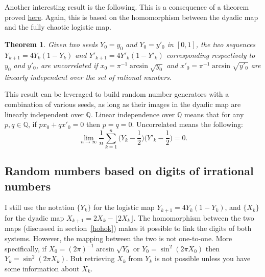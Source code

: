 \documentclass[oneside,10pt]{book}
\newtheorem{theorem}{Theorem}[section]
\begin{document}
Another interesting result is the following. This is a consequence of  a theorem proved
\href{https://stats.stackexchange.com/questions/422354/correlations-between-two-sequences-of-irrational-numbers}{here}. Again, this is based on the homomorphism between the dyadic map and the fully chaotic logistic map.
\begin{theorem}

Given two seeds $Y_0=y_0$ and $Y_0=y'_0$ in $[0, 1]$, the two sequences
$Y_{k+1}=4Y_k(1-Y_k)$ and $Y'_{k+1}=4Y'_k(1-Y'_k)$ corresponding respectively to $y_0$ and $y'_0$, are uncorrelated if
$x_0=\pi^{-1}\arcsin\sqrt{y_0}$
and $x'_0=\pi^{-1}\arcsin\sqrt{y'_0}$ are linearly independent over the set of rational numbers.

\end{theorem}
This result can be leveraged to build \textcolor{index}{random number generators} with a combination of various seeds, as long as their images in the dyadic map
are linearly independent over $\mathbb{Q}$. Linear independence over $\mathbb{Q}$ means that for any $p,q\in\mathbb{Q}$, if $p x_0 + q x'_0=0$ then $p=q=0$.
Uncorrelated means the following:
$$
\lim_{n\rightarrow\infty}\frac{1}{n}\sum_{k=1}^n  \Big(Y_k-\frac{1}{2}\Big)\Big(Y'_k-\frac{1}{2}\Big) = 0.
$$



\subsection{Random numbers based on digits of irrational numbers}\label{puutrew}

I still use the notation $\{Y_k\}$ for the logistic map $Y_{k+1}=4Y_k(1-Y_k)$, and $\{X_k\}$ for the
dyadic map $X_{k+1}=2X_k- \lfloor 2X_k\rfloor$. The homomorphism between the two maps
 (discussed in section~\ref{hohok}) makes it possible to link the digits of both systems. However, the mapping between the two is not one-to-one. More specifically, if $X_0 = (2\pi)^{-1}\arcsin \sqrt{Y_0}$ or $Y_0 = \sin^2(2\pi X_0)$ then $Y_k = \sin^2(2\pi X_k)$. But retrieving
 $X_k$ from $Y_k$ is not possible unless you have some information about $X_k$.
\end{document}
